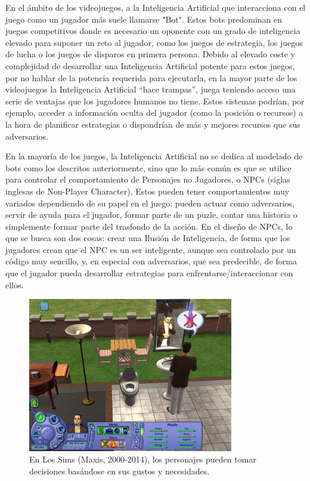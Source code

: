 En el ámbito de los videojuegos, a la Inteligencia Artificial que interacciona con el juego como un jugador más suele llamarse "Bot". Estos bots predominan en juegos competitivos donde es necesario un oponente con un grado de inteligencia elevado para suponer un reto al jugador, como los juegos de estrategia, los juegos de lucha o los juegos de disparos en primera persona. Debido al elevado coste y complejidad de desarrollar una Inteligencia Artificial potente para estos juegos, por no hablar de la potencia requerida para ejecutarla, en la mayor parte de los videojuegos la Inteligencia Artificial ``hace trampas'', juega teniendo acceso una serie de ventajas que los jugadores humanos no tiene. Estos sistemas podrían, por ejemplo, acceder a información oculta del jugador (como la posición o recursos) a la hora de planificar estrategias o dispondrían de más y mejores recursos que sus adversarios. 

En la mayoría de los juegos, la Inteligencia Artificial no se dedica al modelado de bots como los descritos anteriormente, sino que lo más común es que se utilice para controlar el comportamiento de Personajes no Jugadores, o NPCs (siglas inglesas de Non-Player Character). Estos pueden tener comportamientos muy variados dependiendo de su papel en el juego: pueden actuar como adversarios, servir de ayuda para el jugador, formar parte de un puzle, contar una historia o simplemente formar parte del trasfondo de la acción. En el diseño de NPCs, lo que se busca son dos cosas: crear una Ilusión de Inteligencia, de forma que los jugadores crean que el NPC es un ser inteligente, aunque sea controlado por un código muy sencillo, y, en especial con adversarios, que sea predecible, de forma que el jugador pueda desarrollar estrategias para enfrentarse/interaccionar con ellos.

\begin{figure}[h]
	\includegraphics[width=0.8\textwidth]{images/estadodelarte/ai/sims-captura}
	\centering
	\caption{En Los Sims (Maxis, 2000-2014), los personajes pueden tomar decisiones basándose en sus gustos y necesidades.}
\end{figure}

